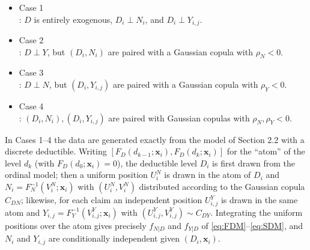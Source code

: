 \documentclass[11pt]{article}
\newcommand{\rev}[1]{{\color{blue}#1}}
\begin{document}
\begin{itemize}
    \item Case 1 \\
    : $D$ is entirely exogenous, \rev{$D_i \perp N_i$, and $D_i \perp Y_{i,j}$}.
    \item Case 2 \\
    : $D\perp Y$, but $(D_i, N_i)$ are paired with a Gaussian copula with $\rho_N<0$.
    \item Case 3 \\
    : $D\perp N$, but $(D_i, Y_{i,j})$ are paired with a Gaussian copula with $\rho_Y<0$.
    \item Case 4 \\
    : $(D_i, N_{i}), (D_i, Y_{i,j})$ are paired with Gaussian copulas with $\rho_N,\rho_Y<0$.
\end{itemize}
\rev{In Cases 1--4 the data are generated exactly from the model of Section 2.2 with a discrete deductible. Writing $[F_D(d_{k-1};\bm{x}_i),F_D(d_k;\bm{x}_i)]$ for the ``atom'' of the level $d_k$ (with $F_D(d_0;\bm{x}_i)=0$), the deductible level $D_i$ is first drawn from the ordinal model; then a uniform position $U^{N}_i$ is drawn in the atom of $D_i$ and $N_i=F_{N}^{-1}(V^{N}_i;\bm{x}_i)$ with $(U^{N}_i,V^{N}_i)$ distributed according to the Gaussian copula $C_{DN}$; likewise, for each claim an independent position $U^{Y}_{i,j}$ is drawn in the same atom and $Y_{i,j}=F_{Y}^{-1}(V^{Y}_{i,j};\bm{x}_i)$ with $(U^{Y}_{i,j},V^{Y}_{i,j})\sim C_{DY}$. Integrating the uniform positions over the atom gives precisely $f_{N|D}$ and $f_{Y|D}$ of \eqref{eq:FDM}--\eqref{eq:SDM}, and $N_i$ and $Y_{i,j}$ are conditionally independent given $(D_i,\bm{x}_i)$.} 
\end{document}
